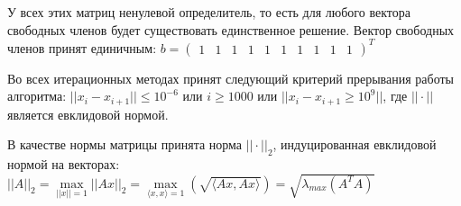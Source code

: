 \documentclass[../../report.tex]{subfiles}
\begin{document}
У всех этих матриц ненулевой определитель, то есть для любого вектора свободных членов будет существовать единственное решение. Вектор свободных членов принят единичным:
$b = \begin{pmatrix}
    1 & 1 & 1 & 1 & 1 & 1 & 1 & 1 & 1 & 1
\end{pmatrix} ^ T
$

Во всех итерационных методах принят следующий критерий прерывания работы алгоритма: $||x_i - x_{i+1}|| \leq 10^{-6}$ или $i \geq 1000$ или $||x_i - x_{i+1} \geq 10^9||$, где $||\cdot||$ является евклидовой нормой.

В качестве нормы матрицы принята норма $||\cdot||_2$, индуцированная евклидовой нормой на векторах:
$  ||A||_2 = 
   \max\limits_{||x|| = 1} ||Ax||_2 = 
   \max\limits_{\langle x, x \rangle = 1}(\sqrt{ \langle Ax, Ax \rangle}) = 
   \sqrt{\lambda_{max}(A^T A)}$
\end{document}
